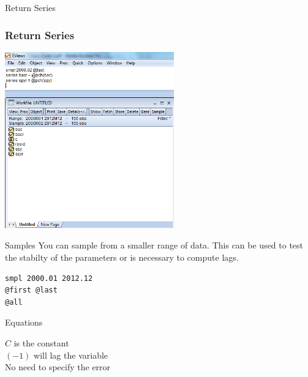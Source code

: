 \documentclass[14pt,xcolor=pdftex,dvipsnames,table]{beamer}\usepackage{graphicx, color}
\begin{document}
\begin{frame}{Return Series}
\graphicspath{{./Figures/}}
\frametitle{Return Series}
\begin{center}
\includegraphics[height = 3.0in]{Returncodefull}
\end{center}
\end{frame} 

\begin{frame}[fragile]{Samples}
You can sample from a smaller range of data.  This can be used to test the stabilty of the parameters or is necessary to compute lags. 
\begin{verbatim}
smpl 2000.01 2012.12
@first @last
@all
\end{verbatim}
\end{frame}

\begin{frame}{Equations}
\graphicspath{{./Figures/}}
\begin{center}
\end{center}

$C$ is the constant\\
$(-1)$ will lag the variable\\
No need to specify the error
\end{frame}
\end{document}
